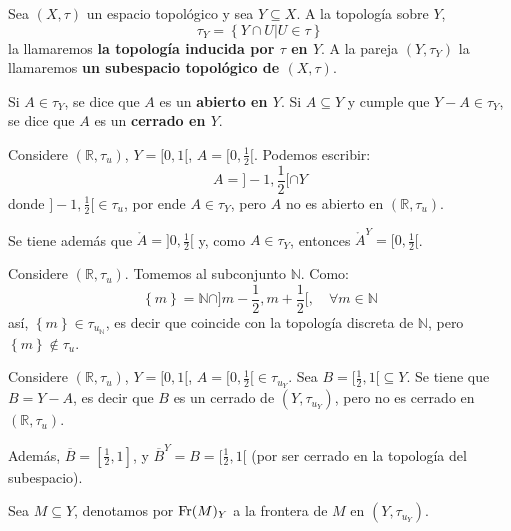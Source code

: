 \documentclass[12pt]{report}
\theoremstyle{largebreak}
\newcommand{\Int}[1]{\ensuremath{\mathring{#1}}}
\newcommand{\Cls}[1]{\ensuremath{\overline{#1}}}
\newcommand{\Fr}[1]{\ensuremath{\textup{Fr}(#1)}}
\begin{document}
    \begin{mydef}
        Sea $(X,\tau)$ un espacio topológico y sea $Y\subseteq X$. A la topología sobre $Y$,
        \begin{equation*}
            \tau_Y=\left\{Y\cap U\Big|U\in\tau \right\}
        \end{equation*}
        la llamaremos \textbf{la topología inducida por $\tau$ en $Y$}. A la pareja $(Y,\tau_Y)$ la llamaremos \textbf{un subespacio topológico de $(X,\tau)$}.

        Si $A\in\tau_Y$, se dice que $A$ es un \textbf{abierto en $Y$}. Si $A\subseteq Y$ y cumple que $Y-A\in\tau_Y$, se dice que $A$ es un \textbf{cerrado en $Y$}.
    \end{mydef}

    \begin{exa}
        Considere $(\mathbb{R},\tau_u)$, $Y=[0,1[$, $A=[0,\frac{1}{2}[$. Podemos escribir:
        \begin{equation*}
            A=]-1,\frac{1}{2}[\cap Y
        \end{equation*}
        donde $]-1,\frac{1}{2}[\in\tau_u$, por ende $A\in\tau_Y$, pero $A$ no es abierto en $(\mathbb{R},\tau_u)$.

        Se tiene además que $\Int{A}=]0,\frac{1}{2}[$ y, como $A\in\tau_Y$, entonces $\Int{A}^Y=[0,\frac{1}{2}[$.
    \end{exa}

    \begin{exa}
        Considere $(\mathbb{R},\tau_u)$. Tomemos al subconjunto $\mathbb{N}$. Como:
        \begin{equation*}
            \left\{m\right\}=\mathbb{N}\cap]m-\frac{1}{2},m+\frac{1}{2}[,\quad\forall m\in\mathbb{N}
        \end{equation*}
        así, $\left\{m \right\}\in\tau_{u_\mathbb{N}}$, es decir que coincide con la topología discreta de $\mathbb{N}$, pero $\left\{m\right\}\notin\tau_u$.
    \end{exa}

    \begin{exa}
        Considere $(\mathbb{R},\tau_u)$, $Y=[0,1[$, $A=[0,\frac{1}{2}[\in\tau_{u_Y }$. Sea $B=[\frac{1}{2},1[\subseteq Y$. Se tiene que $B=Y-A$, es decir que $B$ es un cerrado de $(Y,\tau_{u_Y })$, pero no es cerrado en $(\mathbb{R},\tau_u)$.

        Además, $\Cls{B}=[\frac{1}{2},1]$, y $\Cls{B}^Y=B=[\frac{1}{2},1[$ (por ser cerrado en la topología del subespacio).

        Sea $M\subseteq Y$, denotamos por $\Fr{M}_Y$ a la frontera de $M$ en $(Y,\tau_{u_Y })$.
    \end{exa}
\end{document}
